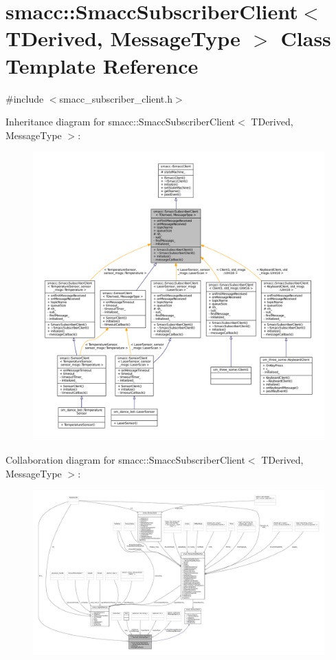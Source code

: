 \hypertarget{classsmacc_1_1SmaccSubscriberClient}{}\section{smacc\+:\+:Smacc\+Subscriber\+Client$<$ T\+Derived, Message\+Type $>$ Class Template Reference}
\label{classsmacc_1_1SmaccSubscriberClient}


{\ttfamily \#include $<$smacc\+\_\+subscriber\+\_\+client.\+h$>$}



Inheritance diagram for smacc\+:\+:Smacc\+Subscriber\+Client$<$ T\+Derived, Message\+Type $>$\+:
\nopagebreak
\begin{figure}[H]
\begin{center}
\leavevmode
\includegraphics[width=350pt]{classsmacc_1_1SmaccSubscriberClient__inherit__graph}
\end{center}
\end{figure}


Collaboration diagram for smacc\+:\+:Smacc\+Subscriber\+Client$<$ T\+Derived, Message\+Type $>$\+:
\nopagebreak
\begin{figure}[H]
\begin{center}
\leavevmode
\includegraphics[width=350pt]{classsmacc_1_1SmaccSubscriberClient__coll__graph}
\end{center}
\end{figure}
